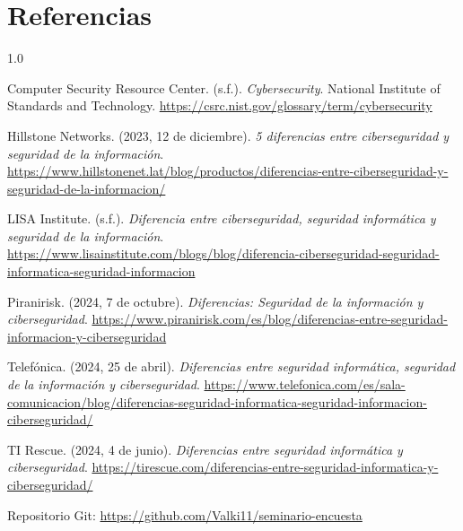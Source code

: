 \documentclass[12pt,letterpaper]{article}
\begin{document}
\section*{Referencias}

\begin{spacing}{1.0}
\small
\setlength{\parindent}{-1.27cm}
\setlength{\leftskip}{1.27cm}

Computer Security Resource Center. (s.f.). \textit{Cybersecurity}. National Institute of Standards and Technology. \url{https://csrc.nist.gov/glossary/term/cybersecurity}

Hillstone Networks. (2023, 12 de diciembre). \textit{5 diferencias entre ciberseguridad y seguridad de la información}. \url{https://www.hillstonenet.lat/blog/productos/diferencias-entre-ciberseguridad-y-seguridad-de-la-informacion/}

LISA Institute. (s.f.). \textit{Diferencia entre ciberseguridad, seguridad informática y seguridad de la información}. \url{https://www.lisainstitute.com/blogs/blog/diferencia-ciberseguridad-seguridad-informatica-seguridad-informacion}

Piranirisk. (2024, 7 de octubre). \textit{Diferencias: Seguridad de la información y ciberseguridad}. \url{https://www.piranirisk.com/es/blog/diferencias-entre-seguridad-informacion-y-ciberseguridad}

Telefónica. (2024, 25 de abril). \textit{Diferencias entre seguridad informática, seguridad de la información y ciberseguridad}. \url{https://www.telefonica.com/es/sala-comunicacion/blog/diferencias-seguridad-informatica-seguridad-informacion-ciberseguridad/}

TI Rescue. (2024, 4 de junio). \textit{Diferencias entre seguridad informática y ciberseguridad}. \url{https://tirescue.com/diferencias-entre-seguridad-informatica-y-ciberseguridad/}

\end{spacing}

\vspace{12pt}
\noindent\small Repositorio Git: \url{https://github.com/Valki11/seminario-encuesta}
\end{document}
